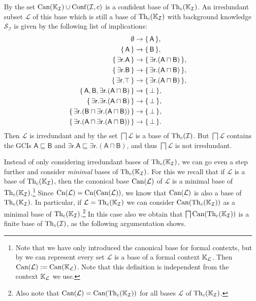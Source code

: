 \begin{Example}
  By  the set $\operatorname{Can}({\mathbb{K}}_{\mathcal{I}}) \cup \operatorname{Conf}(\mathcal{I}, c)$
  is a confident base of $\operatorname{Th}_c({\mathbb{K}}_{\mathcal{I}})$.  An irredundant subset
  $\mathcal{L}$ of this base which is still a base of $\operatorname{Th}_c({\mathbb{K}}_{\mathcal{I}})$ with
  background knowledge $\mathcal{S}_{\mathcal{I}}$ is given by the following list of
  implications:
  \begin{align*}
    \emptyset &\to {\ensuremath{\{\,\mathsf A\,\}}},\\
    {\{\,\mathsf A\,\}}    &\to {\ensuremath{\{\,\mathsf B\,\}}},\\
    {\{\,\mathsf{\exists r.A}\,\}} &\to {\ensuremath{\{\,\mathsf{\exists r.(A \sqcap B)}\,\}}},\\
    {\{\,\mathsf{\exists r.B}\,\}} &\to {\ensuremath{\{\,\mathsf{\exists r.(A \sqcap B)}\,\}}},\\
    {\{\,\mathsf{\exists r.\top}\,\}} &\to {\ensuremath{\{\,\mathsf{\exists r.(A \sqcap B)}\,\}}},\\
    {\{\,\mathsf{A, B, \exists r.(A \sqcap B)}\,\}} &\to {\ensuremath{\{\,\bot\,\}}},\\
    {\{\,\mathsf{\exists r.\exists r.(A \sqcap B)}\,\}} &\to {\ensuremath{\{\,\bot\,\}}},\\
    {\{\,\mathsf{\exists r.(B \sqcap \exists r.(A \sqcap B))}\,\}} &\to {\ensuremath{\{\,\bot\,\}}},\\
    {\{\,\mathsf{\exists r.(A \sqcap \exists r.(A \sqcap B))}\,\}} &\to {\ensuremath{\{\,\bot\,\}}}.
  \end{align*}
  Then $\mathcal{L}$ is irredundant and by
   the set $\bigsqcap
  \mathcal{L}$ is a base of $\operatorname{Th}_c(\mathcal{I})$.  But $\bigsqcap \mathcal{L}$ contains
  the GCIs $\mathsf{A \sqsubseteq B}$ and $\mathsf{\exists r. A \sqsubseteq \exists r. (A
    \sqcap B)}$, and thus $\bigsqcap \mathcal{L}$ is not irredundant.
\end{Example}

Instead of only considering irredundant bases of $\operatorname{Th}_c({\mathbb{K}}_{\mathcal{I}})$, we can go
even a step further and consider \emph{minimal} bases of $\operatorname{Th}_c({\mathbb{K}}_{\mathcal{I}})$.
For this we recall that if $\mathcal{L}$ is a base of $\operatorname{Th}_c({\mathbb{K}}_{\mathcal{I}})$, then
the canonical base $\operatorname{Can}(\mathcal{L})$ of $\mathcal{L}$ is a minimal base of $\operatorname{Th}_c({\mathbb{K}}_{\mathcal{I}})$.\footnote{Note that we have only introduced the canonical base for
  formal contexts, but by  we can represent
  every set $\mathcal{L}$ is a base of a formal context ${\mathbb{K}}_{\mathcal{L}}$.  Then
  $\operatorname{Can}(\mathcal{L}) := \operatorname{Can}({\mathbb{K}}_{\mathcal{L}})$.  Note that this definition is
  independent from the context ${\mathbb{K}}_{\mathcal{L}}$ we use.}  Since $\operatorname{Cn}(\mathcal{L}) =
\operatorname{Cn}(\operatorname{Can}(\mathcal{L}))$, we know that $\operatorname{Can}(\mathcal{L})$ is also a base of $\operatorname{Th}_c({\mathbb{K}}_{\mathcal{I}})$.  In particular, if $\mathcal{L} = \operatorname{Th}_c({\mathbb{K}}_{\mathcal{I}})$ we can
consider $\operatorname{Can}(\operatorname{Th}_c({\mathbb{K}}_{\mathcal{I}}))$ as a minimal base of $\operatorname{Th}_c({\mathbb{K}}_{\mathcal{I}})$.\footnote{Also note that $\operatorname{Can}(\mathcal{L}) = \operatorname{Can}(\operatorname{Th}_c({\mathbb{K}}_{\mathcal{I}}))$ for all bases $\mathcal{L}$ of $\operatorname{Th}_c({\mathbb{K}}_{\mathcal{I}})$.}  In
this case also we obtain that $\bigsqcap \operatorname{Can}(\operatorname{Th}_c({\mathbb{K}}_{\mathcal{I}}))$ is a finite
base of $\operatorname{Th}_c(\mathcal{I})$, as the following argumentation shows.

